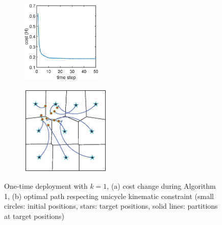\documentclass[letterpaper, 10 pt, conference]{ieeeconf}
\begin{document}
\begin{figure}
	\centering
	 \begin{subfigure}[b]{0.22\textwidth}
	\centering
	\includegraphics[width=1.5in]{figure/init_10_deploy_cmd2}
	\caption{}
	\end{subfigure}	
	 \begin{subfigure}[b]{0.22\textwidth}
	\centering
	\includegraphics[width=1.68in]{figure/init_10_deploy_cmd1}
	\caption{}
\end{subfigure}	
	\caption{One-time deployment with $k=1$, (a) cost change during Algorithm 1, (b) optimal path respecting unicycle kinematic constraint (small circles: initial positions, stars: target positions, solid lines: partitions at target positions)}
	\label{fig:fig2}
\end{figure}
\end{document}

